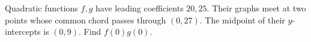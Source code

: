 Quadratic functions $f,g$ have leading coefficients $20,25$. Their graphs meet at two points whose common chord passes through $(0,27)$. The midpoint of their $y$-intercepts is $(0,9)$. Find $f(0)g(0)$.
